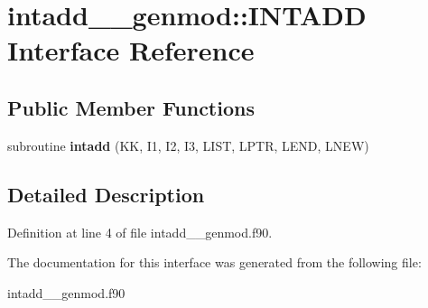 \hypertarget{interfaceintadd____genmod_1_1_i_n_t_a_d_d}{\section{intadd\+\_\+\+\_\+genmod\+:\+:I\+N\+T\+A\+D\+D Interface Reference}
\label{interfaceintadd____genmod_1_1_i_n_t_a_d_d}
}
\subsection*{Public Member Functions}
\begin{DoxyCompactItemize}
\item 
\hypertarget{interfaceintadd____genmod_1_1_i_n_t_a_d_d_aef220e773f78834a1de69e24b9785af3}{subroutine {\bfseries intadd} (K\+K, I1, I2, I3, L\+I\+S\+T, L\+P\+T\+R, L\+E\+N\+D, L\+N\+E\+W)}\label{interfaceintadd____genmod_1_1_i_n_t_a_d_d_aef220e773f78834a1de69e24b9785af3}

\end{DoxyCompactItemize}


\subsection{Detailed Description}


Definition at line 4 of file intadd\+\_\+\+\_\+genmod.\+f90.



The documentation for this interface was generated from the following file\+:\begin{DoxyCompactItemize}
\item 
intadd\+\_\+\+\_\+genmod.\+f90\end{DoxyCompactItemize}
